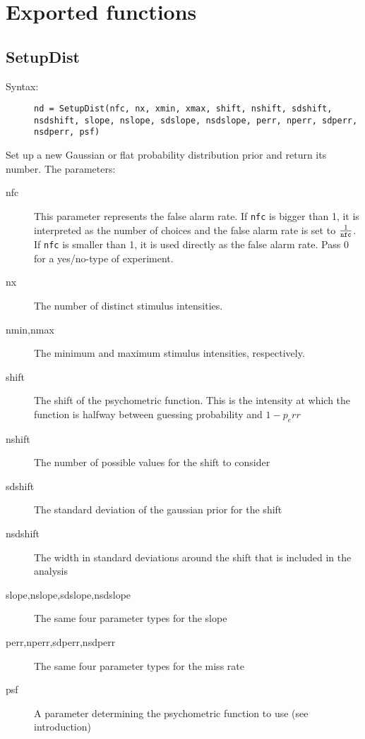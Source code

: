 \documentclass[10pt,letterpaper]{article}
\begin{document}
\section{Exported functions}

\subsection{SetupDist}

\begin{description}
\item[Syntax:] {\tt nd = SetupDist(nfc, nx, xmin, xmax, shift, nshift, sdshift, nsdshift, slope, nslope, sdslope, nsdslope, perr, nperr, sdperr, nsdperr, psf)}
\end{description}

Set up a new Gaussian or flat probability distribution prior and return its 
number. The parameters:

\begin{description}
\item[nfc] This parameter represents the false alarm rate. If {\tt nfc} is bigger than 1, it is interpreted
  as the number of choices and the false alarm rate is set to $\frac{1}{{\tt nfc}}$. If {\tt nfc} is smaller
  than 1, it is used directly as the false alarm rate. Pass 0 for a yes/no-type of experiment.
\item[nx] The number of distinct stimulus intensities.
\item[nmin,nmax] The minimum and maximum stimulus intensities, respectively.
\item[shift] The shift of the psychometric function. This is the intensity at which
  the function is halfway between guessing probability and $1-p_err$
\item[nshift] The number of possible values for the shift to consider
\item[sdshift] The standard deviation of the gaussian prior for the shift
\item[nsdshift] The width in standard deviations around the shift that is included in the analysis
\item[slope,nslope,sdslope,nsdslope] The same four parameter types for the slope
\item[perr,nperr,sdperr,nsdperr] The same four parameter types for the miss rate
\item[psf] A parameter determining the psychometric function to use (see introduction)
\end{description}
\end{document}
